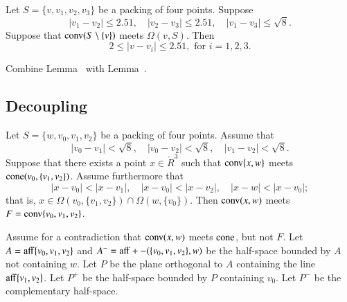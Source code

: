 \begin{tarskidata}
\begin{tarski}
\begin{lemma}
Let $S=\{v,v_1,v_2,v_3\}$ be a
packing of four points. Suppose
  $$
  |v_1-v_2|\le 2.51,\quad 
  |v_2-v_3|\le 2.51,\quad
  |v_1-v_3|\le \sqrt{8}.
  $$
Suppose that
${\operatorname{conv}}(S\setminus \{v\})$ meets $\Omega(v,S)$.
Then
  $$
  2 \le |v-v_i | \le 2.51, \text{ for } i=1,2,3.
  $$
\end{lemma}

\begin{proved}
Combine Lemma~ with Lemma~.
\swallowed\end{proved}
\end{tarski}






\begin{tarski}
\section{Decoupling}

\begin{lemma}
Let $S=\{w,v_0,v_1,v_2\}$ be a packing of four points.
Assume that
   $$
   |v_0-v_1| < \sqrt8,\quad |v_0-v_2| < \sqrt8,\quad |v_1-v_2| < \sqrt8.
   $$
Suppose that there exists a point $x\in\ring{R}^3$
such that 
  ${\operatorname{conv}}\{x,w\}$ meets ${\operatorname{cone}}(v_0,\{v_1,v_2\})$.  
Assume furthermore that
  $$
  |x-v_0| < |x-v_1|,\quad 
  |x-v_0| < |x-v_2|,\quad
  |x-w| < |x-v_0|;
  $$
that is, $x\in\Omega(v_0,\{v_1,v_2\})\cap \Omega(w,\{v_0\})$.
Then ${\operatorname{conv}}(x,w)$ meets $F={\operatorname{conv}}\{v_0,v_1,v_2\}$.
\end{lemma}


\begin{proved} 
Assume for a contradiction that ${\operatorname{conv}}(x,w)$ meets ${\operatorname{cone}}$,
but not $F$.  Let $A = {\operatorname{aff}}\{v_0,v_1,v_2\}$ and $A^-={\operatorname{aff}}+-(\{v_0,v_1,v_2\},w)$
be the half-space bounded by $A$ not containing $w$. 
Let $P$
be the plane orthogonal to $A$ containing the line ${\operatorname{aff}}\{v_1,v_2\}$.
Let $P^+$ be the half-space bounded by $P$ containing $v_0$.  Let
$P^-$ be the complementary half-space.


\end{proved}
\end{tarski}
\end{tarskidata}
